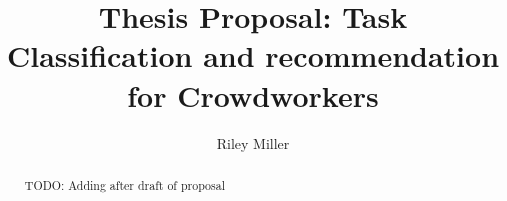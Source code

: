\documentclass[letterpaper,12pt]{article}
\title{Thesis Proposal: Task Classification and recommendation for Crowdworkers}
\author{Riley Miller}
\begin{document}
\nocite{*}


\frontmatter


\maketitle
\newpage


\makecopyright{\the\year}
\newpage


\makesubmittal
\newpage


\begin{abstract}

TODO: Adding after draft of proposal
\end{abstract}

\newpage


\tableofcontents
\newpage






\end{document}
